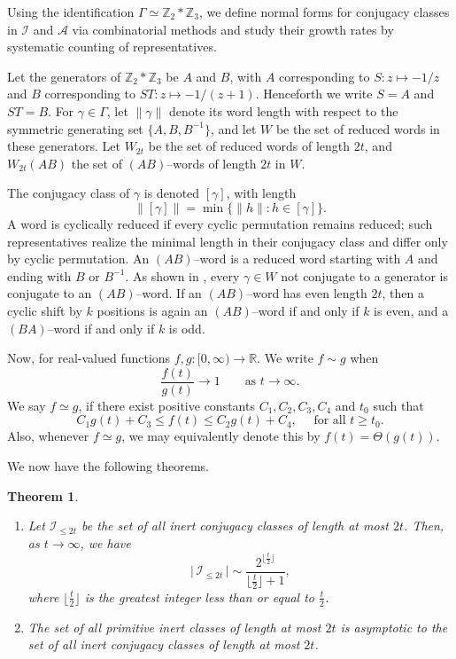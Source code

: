 \documentclass[a4paper,12pt]{amsart}
\numberwithin{equation}{section}
\newtheorem{theorem}{Theorem}[section]
\theoremstyle{definition}
\numberwithin{equation}{section}
\begin{document}
Using the identification $\Gamma \simeq \mathbb{Z}_2 \ast  \mathbb{Z}_3$, we define normal forms for conjugacy classes in $\mathscr{I}$ and $\mathscr{A}$ via combinatorial methods and study their growth rates by systematic counting of representatives.

Let the generators of $\mathbb{Z}_2 \ast  \mathbb{Z}_3$ be $A$ and $B$, with $A$ corresponding to $S: z \mapsto -1/z$ and $B$ corresponding to $ST: z \mapsto -1/(z+1)$. Henceforth we write $S=A$ and $ST=B$. For $\gamma \in \Gamma$, let $\|\gamma\|$ denote its word length with respect to the symmetric generating set $\{A,B,B^{-1}\}$, and let $W$ be the set of reduced words in these generators. Let $W_{2t}$ be the set of reduced words of length $2t$, and $W_{2t}(AB)$ the set of $(AB)$–words of length $2t$ in $W$.

The conjugacy class of $\gamma$ is denoted $[\gamma]$, with length
\[
\|[\gamma]\| = \min\{\|h\| : h \in [\gamma]\}.
\]
A word is cyclically reduced if every cyclic permutation remains reduced; such representatives realize the minimal length in their conjugacy class and differ only by cyclic permutation. An $(AB)$–word is a reduced word starting with $A$ and ending with $B$ or $B^{-1}$. As shown in \cite{combigrowth}, every $\gamma \in W$ not conjugate to a generator is conjugate to an $(AB)$–word. If an $(AB)$–word has even length $2t$, then a cyclic shift by $k$ positions is again an $(AB)$–word if and only if $k$ is even, and a $(BA)$–word if and only if $k$ is odd. 

\medskip Now, for real-valued functions $f, g : [0,\infty) \to \mathbb{R}$.  We write $f \sim g$ when
$$\frac{f(t)}{g(t)} \to 1 \qquad \text{as } t \to \infty.$$
We say $f\simeq g$, if there exist positive constants $C_1,C_2,C_3,C_4$ and
$t_0$ such that
$$
C_1 g(t)+C_3\leq f(t)\leq C_2 g(t)+C_4,~~~~~~\text{for all $t\geq t_0$.}
$$
 Also, whenever $f \simeq g$, we may equivalently denote this by $f(t)=\Theta(g(t))$.

\medskip We now have the following theorems. 
\begin{theorem}\label{inert}

\begin{enumerate}
    \item Let $\mathscr{I}_{\leq2t}$ be the set of all inert conjugacy classes of length at most $2t$. Then, as $t \to \infty$, we have
\[
\lvert\,\mathscr{I}_{\leq2t}\,\rvert \sim \frac{2^{\lfloor \frac{t}{2} \rfloor}}{\lfloor \frac{t}{2} \rfloor +1},
\]
where $\lfloor \frac{t}{2} \rfloor$ is the greatest integer less than or equal to $\frac{t}{2}$.
\item The set of all primitive inert classes of length at most $2t$ is asymptotic to the set of all inert conjugacy classes of length at most $2t$.
\end{enumerate}

\end{theorem}
\end{document}
